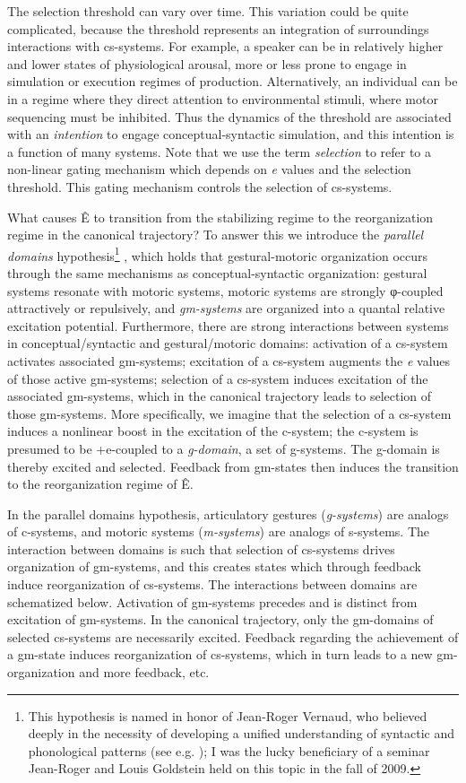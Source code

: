   The selection threshold can vary over time. This variation could be quite complicated, because the threshold represents an integration of surroundings interactions with cs-systems. For example, a speaker can be in relatively higher and lower states of physiological arousal, more or less prone to engage in simulation or execution regimes of production. Alternatively, an individual can be in a regime where they direct attention to environmental stimuli, where motor sequencing must be inhibited. Thus the dynamics of the threshold are associated with an \textit{intention} to engage conceptual-syntactic simulation, and this intention is a function of many systems. Note that we use the term \textit{selection} to refer to a non-linear gating mechanism which depends on \textit{e} values and the selection threshold. This gating mechanism controls the selection of cs-systems.

  What causes Ê to transition from the stabilizing regime to the reorganization regime in the canonical trajectory? To answer this we introduce the \textit{parallel domains} hypothesis\footnote{This hypothesis is named in honor of Jean-Roger Vernaud, who believed deeply in the necessity of developing a unified understanding of syntactic and phonological patterns (see e.g. \citealt{FreidinVergnaud2001,Vergnaud1977}); I was the lucky beneficiary of a seminar Jean-Roger and Louis Goldstein held on this topic in the fall of 2009.} , which holds that gestural-motoric organization occurs through the same mechanisms as conceptual-syntactic organization: gestural systems resonate with motoric systems, motoric systems are strongly φ-coupled attractively or repulsively, and \textit{gm-systems} are organized into a quantal relative excitation potential. Furthermore, there are strong interactions between systems in conceptual/syntactic and gestural/motoric domains: activation of a cs-system activates associated gm-systems; excitation of a cs-system augments the \textit{e} values of those active gm-systems; selection of a cs-system induces excitation of the associated gm-systems, which in the canonical trajectory leads to selection of those gm-systems. More specifically, we imagine that the selection of a cs-system induces a nonlinear boost in the excitation of the c-system; the c-system is presumed to be +e-coupled to a \textit{g-domain}, a set of g-systems. The g-domain is thereby excited and selected. Feedback from gm-states then induces the transition to the reorganization regime of  Ê.

  In the parallel domains hypothesis, articulatory gestures (\textit{g-systems}) are analogs of c-systems, and motoric systems (\textit{m-systems}) are analogs of s-systems. The interaction between domains is such that selection of cs-systems drives organization of gm-systems, and this creates states which through feedback induce reorganization of cs-systems. The interactions between domains are schematized below. Activation of gm-systems precedes and is distinct from excitation of gm-systems. In the canonical trajectory, only the gm-domains of selected cs-systems are necessarily excited. Feedback regarding the achievement of a gm-state induces reorganization of cs-systems, which in turn leads to a new gm-organization and more feedback, etc.

